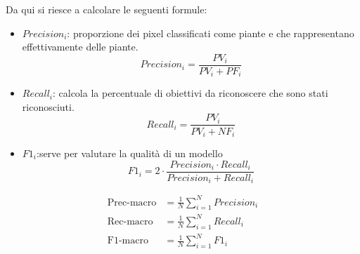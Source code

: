 Da qui si riesce a calcolare le seguenti formule:

\begin{itemize}
    \item $Precision_i$: proporzione dei pixel classificati come piante e che rappresentano
effettivamente delle piante.
\[
Precision_i=\frac{PV_i}{PV_i+PF_i}
\]
    \item $Recall_i$: calcola la percentuale di obiettivi da riconoscere che sono stati
riconosciuti.
\[
Recall_i=\frac{PV_i}{PV_i + NF_i}
\]
    \item $F1_i$:serve per valutare la qualità di un modello
    \[
    F1_i=2\cdot\frac{Precision_i\cdot Recall_i}{Precision_i+Recall_i}
    \]
\end{itemize}
\begin{align}
    \text{Prec-macro}&=\frac{1}{N}\sum^N_{i=1}Precision_i\\
    \text{Rec-macro}&=\frac{1}{N}\sum^N_{i=1}Recall_i\\
    \text{F1-macro}&=\frac{1}{N}\sum^N_{i=1}F1_i
\end{align}

